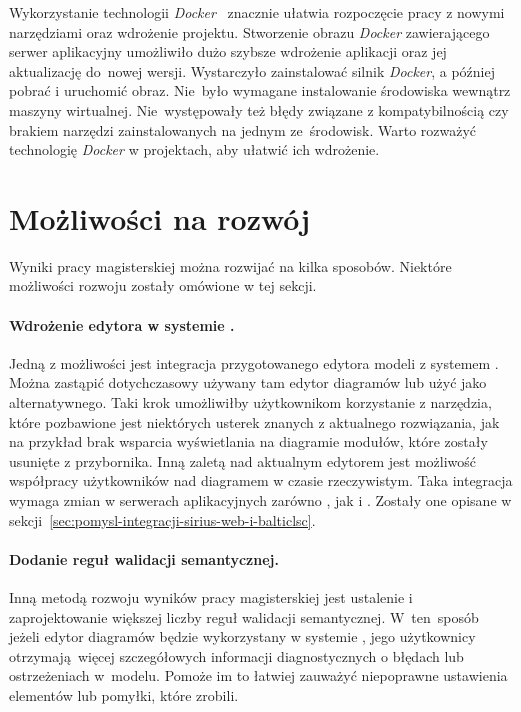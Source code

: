 Wykorzystanie technologii \emph{Docker}~\cite{wikipedia-docker} znacznie
ułatwia rozpoczęcie pracy z
nowymi narzędziami oraz wdrożenie projektu.
Stworzenie obrazu \emph{Docker} zawierającego serwer aplikacyjny \SiriusWeb{}
umożliwiło dużo szybsze wdrożenie aplikacji oraz jej aktualizację
do~nowej wersji. Wystarczyło zainstalować silnik \emph{Docker}, a później
pobrać i uruchomić obraz. Nie~było wymagane instalowanie środowiska \Java{}
wewnątrz maszyny wirtualnej. Nie~występowały też błędy związane z
kompatybilnością czy brakiem narzędzi zainstalowanych na jednym ze~środowisk.
Warto rozważyć technologię \emph{Docker} w projektach, aby ułatwić ich
wdrożenie.

\section{Możliwości na rozwój}

Wyniki pracy magisterskiej można rozwijać na kilka sposobów. Niektóre
możliwości rozwoju zostały omówione w tej sekcji.

\paragraph{Wdrożenie edytora w systemie \BalticLSC{}.}
Jedną z możliwości jest integracja przygotowanego edytora modeli z systemem
\BalticLSC{}. Można zastąpić dotychczasowy używany tam edytor diagramów lub
użyć \SiriusWeb{} jako alternatywnego. Taki krok umożliwiłby użytkownikom
\BalticLSC{} korzystanie z narzędzia, które pozbawione jest niektórych
usterek znanych z aktualnego rozwiązania, jak na przykład brak wsparcia
wyświetlania na diagramie modułów, które zostały usunięte z przybornika.
Inną zaletą \SiriusWeb{} nad aktualnym edytorem jest możliwość współpracy
użytkowników nad diagramem w czasie rzeczywistym. Taka integracja wymaga zmian
w serwerach aplikacyjnych zarówno \SiriusWeb{}, jak i \BalticLSC{}.
Zostały one opisane w
sekcji~\ref{sec:pomysl-integracji-sirius-web-i-balticlsc}.

\paragraph{Dodanie reguł walidacji semantycznej.}
Inną metodą rozwoju wyników pracy magisterskiej jest ustalenie i
zaprojektowanie większej liczby reguł walidacji semantycznej. W~ten~sposób
jeżeli edytor diagramów będzie wykorzystany w systemie \BalticLSC{}, jego
użytkownicy otrzymają więcej szczegółowych informacji diagnostycznych o błędach
lub ostrzeżeniach w~modelu. Pomoże im to łatwiej zauważyć niepoprawne
ustawienia elementów lub pomyłki, które zrobili.

